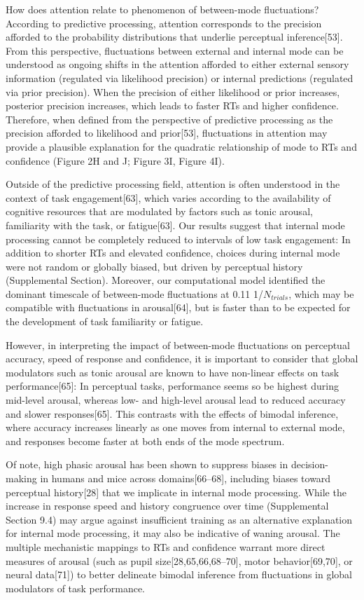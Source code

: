 \documentclass[
]{article}
\begin{document}
How does attention relate to phenomenon of between-mode fluctuations?
According to predictive processing, attention corresponds to the
precision afforded to the probability distributions that underlie
perceptual inference{[}53{]}. From this perspective, fluctuations
between external and internal mode can be understood as ongoing shifts
in the attention afforded to either external sensory information
(regulated via likelihood precision) or internal predictions (regulated
via prior precision). When the precision of either likelihood or prior
increases, posterior precision increases, which leads to faster RTs and
higher confidence. Therefore, when defined from the perspective of
predictive processing as the precision afforded to likelihood and
prior{[}53{]}, fluctuations in attention may provide a plausible
explanation for the quadratic relationship of mode to RTs and confidence
(Figure 2H and J; Figure 3I, Figure 4I).

Outside of the predictive processing field, attention is often
understood in the context of task engagement{[}63{]}, which varies
according to the availability of cognitive resources that are modulated
by factors such as tonic arousal, familiarity with the task, or
fatigue{[}63{]}. Our results suggest that internal mode processing
cannot be completely reduced to intervals of low task engagement: In
addition to shorter RTs and elevated confidence, choices during internal
mode were not random or globally biased, but driven by perceptual
history (Supplemental Section). Moreover, our computational model
identified the dominant timescale of between-mode fluctuations at 0.11
1/\(N_{trials}\), which may be compatible with fluctuations in
arousal{[}64{]}, but is faster than to be expected for the development
of task familiarity or fatigue.

However, in interpreting the impact of between-mode fluctuations on
perceptual accuracy, speed of response and confidence, it is important
to consider that global modulators such as tonic arousal are known to
have non-linear effects on task performance{[}65{]}: In perceptual
tasks, performance seems so be highest during mid-level arousal, whereas
low- and high-level arousal lead to reduced accuracy and slower
responses{[}65{]}. This contrasts with the effects of bimodal inference,
where accuracy increases linearly as one moves from internal to external
mode, and responses become faster at both ends of the mode spectrum.

Of note, high phasic arousal has been shown to suppress biases in
decision-making in humans and mice across domains{[}66--68{]}, including
biases toward perceptual history{[}28{]} that we implicate in internal
mode processing. While the increase in response speed and history
congruence over time (Supplemental Section 9.4) may argue against
insufficient training as an alternative explanation for internal mode
processing, it may also be indicative of waning arousal. The multiple
mechanistic mappings to RTs and confidence warrant more direct measures
of arousal (such as pupil size{[}28,65,66,68--70{]}, motor
behavior{[}69,70{]}, or neural data{[}71{]}) to better delineate bimodal
inference from fluctuations in global modulators of task performance.
\end{document}
